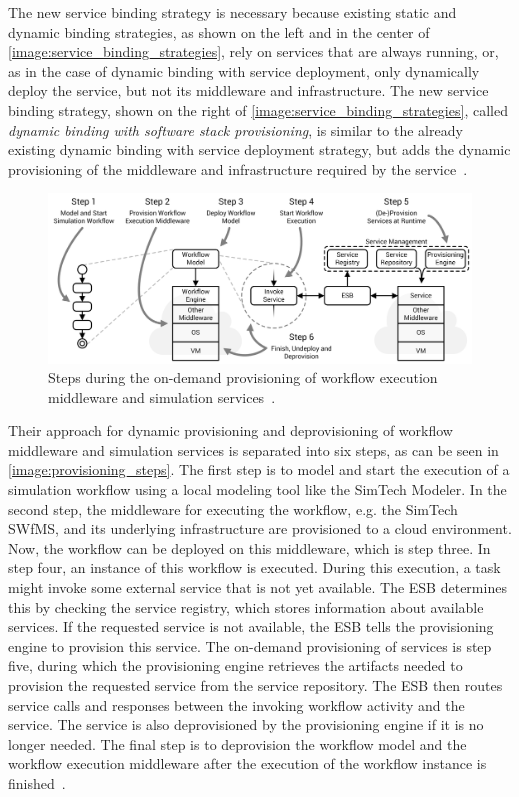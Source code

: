 The new service binding strategy is necessary because existing static and dynamic binding strategies, as shown on the left and in the center of \autoref{image:service_binding_strategies}, rely on services that are always running, or, as in the case of dynamic binding with service deployment, only dynamically deploy the service, but not its middleware and infrastructure.
The new service binding strategy, shown on the right of \autoref{image:service_binding_strategies}, called \textit{dynamic binding with software stack provisioning}, is similar to the already existing dynamic binding with service deployment strategy, but adds the dynamic provisioning of the middleware and infrastructure required by the service~\autocite{provisioning:ondemand}.

\begin{figure}[!htbp]
	\centering
	\includegraphics[resolution=600]{previous/assets/provisioning_steps}
	\caption{Steps during the on-demand provisioning of workflow execution middleware and simulation services~\autocite[based on][]{provisioning:ondemand}.}
	\label{image:provisioning_steps}
\end{figure}

Their approach for dynamic provisioning and deprovisioning of workflow middleware and simulation services is separated into six steps, as can be seen in \autoref{image:provisioning_steps}.
The first step is to model and start the execution of a simulation workflow using a local modeling tool like the SimTech Modeler.
In the second step, the middleware for executing the workflow, e.g. the SimTech SWfMS, and its underlying infrastructure are provisioned to a cloud environment.
Now, the workflow can be deployed on this middleware, which is step three.
In step four, an instance of this workflow is executed.
During this execution, a task might invoke some external service that is not yet available.
The ESB determines this by checking the service registry, which stores information about available services.
If the requested service is not available, the ESB tells the provisioning engine to provision this service.
The on-demand provisioning of services is step five, during which the provisioning engine retrieves the artifacts needed to provision the requested service from the service repository.
The ESB then routes service calls and responses between the invoking workflow activity and the service.
The service is also deprovisioned by the provisioning engine if it is no longer needed.
The final step is to deprovision the workflow model and the workflow execution middleware after the execution of the workflow instance is finished~\autocite{provisioning:ondemand}.

